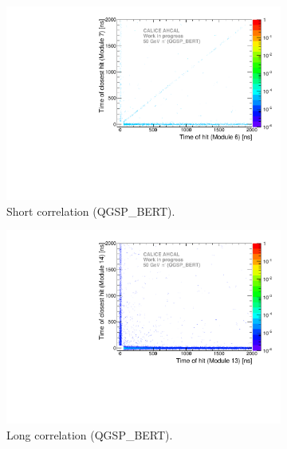\begin{figure}[htbp!]
  \begin{subfigure}[t]{0.5\textwidth}
    \centering
    \includegraphics[width=1\textwidth]{../Thesis_Plots/Timing/Pions/Plots/ComparisonToSim/Time_Correlation_50GeV_short_QGSPBERT.pdf}
    \caption{Short correlation (QGSP\_BERT).}\label{fig:Corr_short_QGSPBERT}
  \end{subfigure}
  \hfill
  \begin{subfigure}[t]{0.5\textwidth}
    \centering
    \includegraphics[width=1\textwidth]{../Thesis_Plots/Timing/Pions/Plots/ComparisonToSim/Time_Correlation_50GeV_long_QGSPBERT.pdf}
    \caption{Long correlation (QGSP\_BERT).} \label{fig:Corr_long_QGSPBERT}
  \end{subfigure}
  \hfill
  \begin{subfigure}[t]{0.5\textwidth}

\end{subfigure}
\end{figure}

